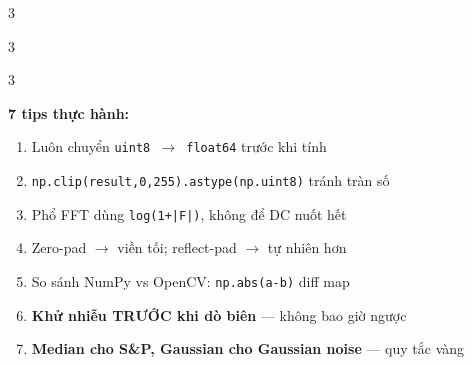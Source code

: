 \documentclass[9pt,landscape,a4paper]{extarticle}
\begin{document}
\begin{multicols*}{3}
\begin{multicols*}{3}
\begin{multicols}{3}
\begin{tipbox}
\textbf{7 tips thực hành:}
\begin{enumerate}
  \item Luôn chuyển \texttt{uint8 $\to$ float64} trước khi tính
  \item \texttt{np.clip(result,0,255).astype(np.uint8)} tránh tràn số
  \item Phổ FFT dùng \texttt{log(1+|F|)}, không để DC nuốt hết
  \item Zero-pad $\to$ viền tối; reflect-pad $\to$ tự nhiên hơn
  \item So sánh NumPy vs OpenCV: \texttt{np.abs(a-b)} diff map
  \item \textbf{Khử nhiễu TRƯỚC khi dò biên} --- không bao giờ ngược
  \item \textbf{Median cho S\&P, Gaussian cho Gaussian noise} --- quy tắc vàng
\end{enumerate}
\end{tipbox}

\end{multicols}

\end{multicols*}

\end{multicols*}
\end{document}
